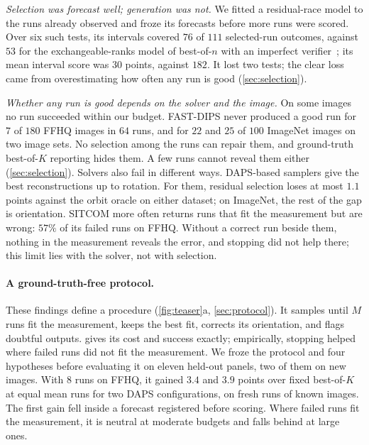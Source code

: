 \emph{Selection was forecast well; generation was not.}
We fitted a residual-race model to the runs already observed and froze its forecasts before more runs were scored.
Over six such tests, its intervals covered $76$ of $111$ selected-run outcomes, against $53$ for the exchangeable-ranks model of best-of-$n$ with an imperfect verifier~\cite{stroebl2026limits}; its mean interval score was $30$ points, against $182$.
It lost two tests; the clear loss came from overestimating how often any run is good (\cref{sec:selection}).

\emph{Whether any run is good depends on the solver and the image.}
On some images no run succeeded within our budget.
FAST-DIPS never produced a good run for $7$ of $180$ FFHQ images in $64$ runs, and for $22$ and $25$ of $100$ ImageNet images on two image sets.
No selection among the runs can repair them, and ground-truth best-of-$K$ reporting hides them.
A few runs cannot reveal them either (\cref{sec:selection}).
Solvers also fail in different ways.
DAPS-based samplers give the best reconstructions up to rotation.
For them, residual selection loses at most $1.1$ points against the orbit oracle on either dataset; on ImageNet, the rest of the gap is orientation.
SITCOM more often returns runs that fit the measurement but are wrong: $57\%$ of its failed runs on FFHQ.
Without a correct run beside them, nothing in the measurement reveals the error, and stopping did not help there; this limit lies with the solver, not with selection.

\paragraph{A ground-truth-free protocol.}
These findings define a procedure (\cref{fig:teaser}a, \cref{sec:protocol}).
It samples until $M$ runs fit the measurement, keeps the best fit, corrects its orientation, and flags doubtful outputs.
 gives its cost and success exactly; empirically, stopping helped where failed runs did not fit the measurement.
We froze the protocol and four hypotheses before evaluating it on eleven held-out panels, two of them on new images.
With $8$ runs on FFHQ, it gained $3.4$ and $3.9$ points over fixed best-of-$K$ at equal mean runs for two DAPS configurations, on fresh runs of known images.
The first gain fell inside a forecast registered before scoring.
Where failed runs fit the measurement, it is neutral at moderate budgets and falls behind at large ones.

